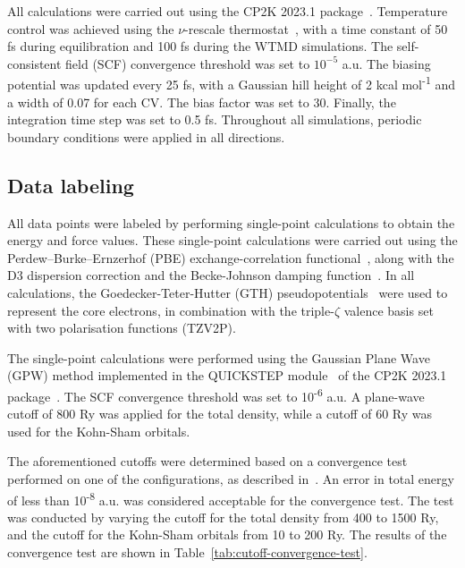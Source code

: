 All calculations were carried out using the CP2K 2023.1 package~\citep{kuhneCP2KElectronicStructure2020}. Temperature control was achieved using the $\nu$-rescale thermostat~\citep{bussiCanonicalSamplingVelocity2007}, with a time constant of 50 fs during equilibration and 100 fs during the WTMD simulations. The self-consistent field (SCF) convergence threshold was set to $10^{-5}$ a.u. The biasing potential was updated every 25 fs, with a Gaussian hill height of 2 kcal mol\textsuperscript{-1} and a width of 0.07 for each CV. The bias factor was set to 30. Finally, the integration time step was set to 0.5 fs. Throughout all simulations, periodic boundary conditions were applied in all directions.



\subsection{Data labeling}
All data points were labeled by performing single-point calculations to obtain the energy and force values. These single-point calculations were carried out using the Perdew–Burke–Ernzerhof (PBE) exchange-correlation functional~\citep{perdewGeneralizedGradientApproximation1996}, along with the D3 dispersion correction and the Becke-Johnson damping function~\citep{grimmeConsistentAccurateInitio2010,grimmeEffectDampingFunction2011}. In all calculations, the Goedecker-Teter-Hutter (GTH) pseudopotentials~\citep{goedeckerSeparableDualspaceGaussian1996,hartwigsenRelativisticSeparableDualspace1998} were used to represent the core electrons, in combination with the triple-$\zeta$ valence basis set with two polarisation functions (TZV2P).

The single-point calculations were performed using the Gaussian Plane Wave \; (GPW) method implemented in the QUICKSTEP module~\citep{vandevondeleQuickstepFastAccurate2005} of the CP2K 2023.1 package~\citep{kuhneCP2KElectronicStructure2020}. The SCF convergence threshold was set to 10\textsuperscript{-6} a.u. A plane-wave cutoff of 800 Ry was applied for the total density, while a cutoff of 60 Ry was used for the Kohn-Sham orbitals.

The aforementioned cutoffs were determined based on a convergence test performed on one of the configurations, as described in~\citep{cp2k_developersHowConvergeCUTOFF}. An error in total energy of less than 10\textsuperscript{-8} a.u. was considered acceptable for the convergence test. The test was conducted by varying the cutoff for the total density from 400 to 1500 Ry, and the cutoff for the Kohn-Sham orbitals from 10 to 200 Ry. The results of the convergence test are shown in Table~\ref{tab:cutoff-convergence-test}.



